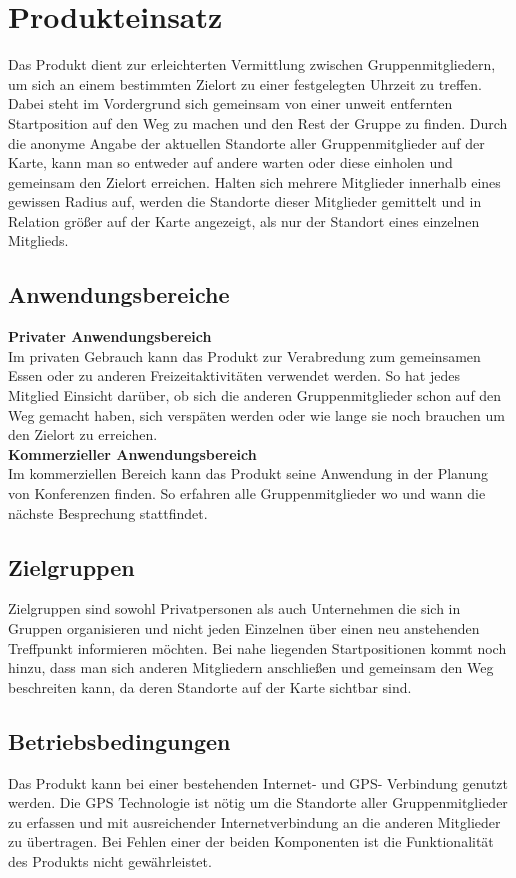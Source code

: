
\section{Produkteinsatz}
Das Produkt dient zur erleichterten Vermittlung zwischen Gruppenmitgliedern, um sich an einem bestimmten Zielort zu einer festgelegten Uhrzeit zu treffen. Dabei steht im Vordergrund sich gemeinsam von einer unweit entfernten Startposition auf den Weg zu machen und den Rest der Gruppe zu finden. 
Durch die anonyme Angabe der aktuellen Standorte aller Gruppenmitglieder auf der Karte, kann man so entweder auf andere warten oder diese einholen und gemeinsam den Zielort erreichen. Halten sich mehrere Mitglieder innerhalb eines gewissen Radius auf, werden die Standorte dieser Mitglieder gemittelt und in Relation größer auf der Karte angezeigt, als nur der Standort eines einzelnen Mitglieds.\\

\subsection{Anwendungsbereiche}
\textbf{Privater Anwendungsbereich} \\
Im privaten Gebrauch kann das Produkt zur Verabredung zum gemeinsamen Essen oder zu anderen Freizeitaktivitäten verwendet werden. So hat jedes Mitglied Einsicht darüber, ob sich die anderen Gruppenmitglieder schon auf den Weg gemacht haben, sich verspäten werden oder wie lange sie noch brauchen um den Zielort zu erreichen.\\

\textbf{Kommerzieller Anwendungsbereich} \\
Im kommerziellen Bereich kann das Produkt seine Anwendung in der Planung von Konferenzen finden. So erfahren alle Gruppenmitglieder wo und wann die nächste Besprechung stattfindet. \\

\subsection{Zielgruppen}
Zielgruppen sind sowohl Privatpersonen als auch Unternehmen die sich in Gruppen organisieren und nicht jeden Einzelnen über einen neu anstehenden Treffpunkt informieren möchten. Bei nahe liegenden Startpositionen kommt noch hinzu, dass man sich anderen Mitgliedern anschließen und gemeinsam den Weg beschreiten kann, da deren Standorte auf der Karte sichtbar sind.\\

\subsection{Betriebsbedingungen}
Das Produkt kann bei einer bestehenden Internet- und GPS- Verbindung genutzt werden. Die GPS Technologie ist nötig um die Standorte aller Gruppenmitglieder zu erfassen und mit ausreichender Internetverbindung an die anderen Mitglieder zu übertragen. Bei Fehlen einer der beiden Komponenten ist die Funktionalität des Produkts nicht gewährleistet.\\

